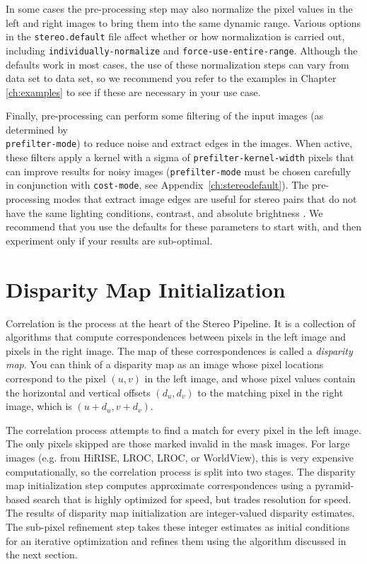 In some cases the pre-processing step may also normalize the pixel
values in the left and right images to bring them into the same
dynamic range.  Various options in the {\tt stereo.default} file
affect whether or how normalization is carried out, including
\texttt{individually-normalize} and
\texttt{force-use-entire-range}.  Although the defaults work in
most cases, the use of these normalization steps can vary from data
set to data set, so we recommend you refer to the examples in Chapter
\ref{ch:examples} to see if these are necessary in your use case.

Finally, pre-processing can perform some filtering of the input
images (as determined by \\ \texttt{prefilter-mode}) to reduce noise
and extract edges in the images.  When active, these filters apply
a kernel with a sigma of \texttt{prefilter-kernel-width} pixels
that can improve results for noisy images (\texttt{prefilter-mode}
must be chosen carefully in conjunction with \texttt{cost-mode},
see Appendix~\ref{ch:stereodefault}).  The pre-processing modes
that extract image edges are useful for stereo pairs that do not
have the same lighting conditions, contrast, and absolute brightness
\citep{Nishihara84practical}.  We recommend that you use the defaults
for these parameters to start with, and then experiment only if
your results are sub-optimal.

\section{Disparity Map Initialization}

Correlation is the process at the heart of the Stereo Pipeline.  It is
a collection of algorithms that compute correspondences between pixels
in the left image and pixels in the right image.  The map of these
correspondences is called a {\em disparity map}.  You can think of a
disparity map as an image whose pixel locations correspond to
the pixel $(u,v)$ in the left image, and whose pixel values
contain the horizontal and vertical offsets $(d_u, d_v)$ to the
matching pixel in the right image, which is $(u+d_u, v+d_v)$.

The correlation process attempts to find a match for every pixel in
the left image. The only pixels skipped are those marked invalid in
the mask images. For large images (e.g. from \ac{HiRISE}, \acl{LROC},
\acs{LROC}, or WorldView), this is very expensive computationally, so
the correlation process is split into two stages.  The disparity map
initialization step computes approximate correspondences using a
pyramid-based search that is highly optimized for speed, but trades
resolution for speed. The results of disparity map initialization are
integer-valued disparity estimates.  The sub-pixel refinement step
takes these integer estimates as initial conditions for an iterative
optimization and refines them using the algorithm discussed in the
next section.

